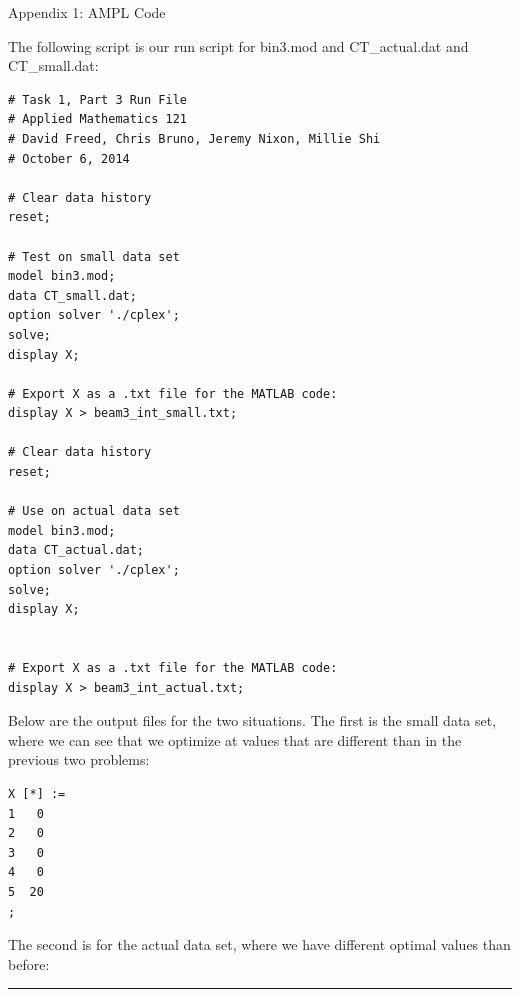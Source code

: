 \documentclass[12pt]{article}
\makeatletter
\newenvironment{task}{\@startsection
       {section}{1}
       {0.4em}{-.5ex plus -1ex minus -.2ex}{.5ex plus .2ex}
       {\pagebreak[3]\large\bf\noindent{Task}}}
       {\nopagebreak[3]\vspace{3ex}\begin{center}\rule{1\linewidth}{.3pt}\end{center}}
\makeatother
\begin{document}
\begin{task}{Appendix 1: AMPL Code}
\begin{enumerate}
The following script is our run script for bin3.mod and CT\_actual.dat and CT\_small.dat:

\begin{lstlisting}
# Task 1, Part 3 Run File
# Applied Mathematics 121
# David Freed, Chris Bruno, Jeremy Nixon, Millie Shi
# October 6, 2014

# Clear data history
reset;

# Test on small data set
model bin3.mod;
data CT_small.dat;
option solver './cplex';
solve;
display X;

# Export X as a .txt file for the MATLAB code:
display X > beam3_int_small.txt;

# Clear data history
reset;

# Use on actual data set
model bin3.mod;
data CT_actual.dat;
option solver './cplex';
solve;
display X;


# Export X as a .txt file for the MATLAB code:
display X > beam3_int_actual.txt;
\end{lstlisting}

Below are the output files for the two situations. The first is the small data set, where we can see that we optimize at values that are different than in the previous two problems:

\begin{lstlisting}
X [*] :=
1   0
2   0
3   0
4   0
5  20
;
\end{lstlisting}

The second is for the actual data set, where we have different optimal values than before:


\end{enumerate}
\end{task}
\end{document}
